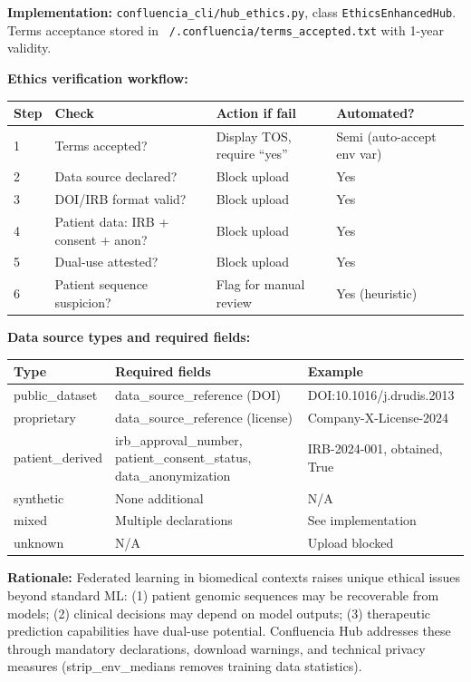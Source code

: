 \textbf{Implementation:} \texttt{confluencia\_cli/hub\_ethics.py}, class \texttt{EthicsEnhancedHub}. Terms acceptance stored in \texttt{~/.confluencia/terms\_accepted.txt} with 1-year validity.

\textbf{Ethics verification workflow:}

\begin{tabular}{llll}
\toprule
\textbf{Step} & \textbf{Check} & \textbf{Action if fail} & \textbf{Automated?} \\
\midrule
1 & Terms accepted? & Display TOS, require ``yes'' & Semi (auto-accept env var) \\
2 & Data source declared? & Block upload & Yes \\
3 & DOI/IRB format valid? & Block upload & Yes \\
4 & Patient data: IRB + consent + anon? & Block upload & Yes \\
5 & Dual-use attested? & Block upload & Yes \\
6 & Patient sequence suspicion? & Flag for manual review & Yes (heuristic) \\
\bottomrule
\end{tabular}

\textbf{Data source types and required fields:}

\begin{tabular}{lll}
\toprule
\textbf{Type} & \textbf{Required fields} & \textbf{Example} \\
\midrule
public\_dataset & data\_source\_reference (DOI) & DOI:10.1016/j.drudis.2013 \\
proprietary & data\_source\_reference (license) & Company-X-License-2024 \\
patient\_derived & irb\_approval\_number, patient\_consent\_status, data\_anonymization & IRB-2024-001, obtained, True \\
synthetic & None additional & N/A \\
mixed & Multiple declarations & See implementation \\
unknown & N/A & Upload blocked \\
\bottomrule
\end{tabular}

\textbf{Rationale:} Federated learning in biomedical contexts raises unique ethical issues beyond standard ML: (1) patient genomic sequences may be recoverable from models; (2) clinical decisions may depend on model outputs; (3) therapeutic prediction capabilities have dual-use potential. Confluencia Hub addresses these through mandatory declarations, download warnings, and technical privacy measures (strip\_env\_medians removes training data statistics).

